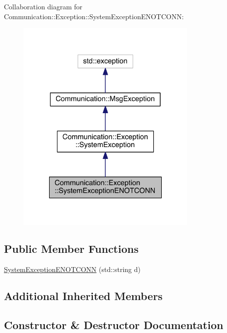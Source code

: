 Collaboration diagram for Communication\+:\+:Exception\+:\+:System\+Exception\+E\+N\+O\+T\+C\+O\+N\+N\+:\nopagebreak
\begin{figure}[H]
\begin{center}
\leavevmode
\includegraphics[width=250pt]{class_communication_1_1_exception_1_1_system_exception_e_n_o_t_c_o_n_n__coll__graph}
\end{center}
\end{figure}
\subsection*{Public Member Functions}
\begin{DoxyCompactItemize}
\item 
\hyperlink{class_communication_1_1_exception_1_1_system_exception_e_n_o_t_c_o_n_n_a9590d8d07b19db4d719953ff2d45d40d}{System\+Exception\+E\+N\+O\+T\+C\+O\+N\+N} (std\+::string d)
\end{DoxyCompactItemize}
\subsection*{Additional Inherited Members}


\subsection{Constructor \& Destructor Documentation}
\hypertarget{class_communication_1_1_exception_1_1_system_exception_e_n_o_t_c_o_n_n_a9590d8d07b19db4d719953ff2d45d40d}{}
